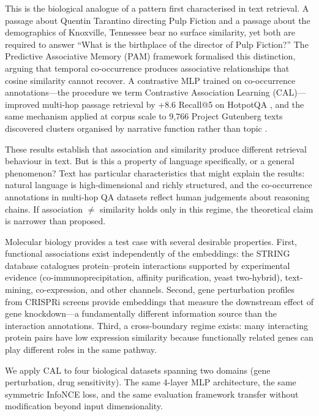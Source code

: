 \documentclass[11pt]{article}
\begin{document}
This is the biological analogue of a pattern first characterised in text retrieval. A passage about Quentin Tarantino directing Pulp Fiction and a passage about the demographics of Knoxville, Tennessee bear no surface similarity, yet both are required to answer ``What is the birthplace of the director of Pulp Fiction?'' The Predictive Associative Memory (PAM) framework \citep{dury2026pam} formalised this distinction, arguing that temporal co-occurrence produces associative relationships that cosine similarity cannot recover. A contrastive MLP trained on co-occurrence annotations---the procedure we term Contrastive Association Learning (CAL)---improved multi-hop passage retrieval by +8.6 Recall@5 on HotpotQA \citep{dury2026aar}, and the same mechanism applied at corpus scale to 9,766 Project Gutenberg texts discovered clusters organised by narrative function rather than topic \citep{dury2026concepts}.

These results establish that association and similarity produce different retrieval behaviour in text. But is this a property of language specifically, or a general phenomenon? Text has particular characteristics that might explain the results: natural language is high-dimensional and richly structured, and the co-occurrence annotations in multi-hop QA datasets reflect human judgements about reasoning chains. If association $\neq$ similarity holds only in this regime, the theoretical claim is narrower than proposed.

Molecular biology provides a test case with several desirable properties. First, functional associations exist independently of the embeddings: the STRING database \citep{szklarczyk2023string} catalogues protein--protein interactions supported by experimental evidence (co-immunoprecipitation, affinity purification, yeast two-hybrid), text-mining, co-expression, and other channels. Second, gene perturbation profiles from CRISPRi screens \citep{replogle2022mapping} provide embeddings that measure the downstream effect of gene knockdown---a fundamentally different information source than the interaction annotations. Third, a cross-boundary regime exists: many interacting protein pairs have low expression similarity because functionally related genes can play different roles in the same pathway.

We apply CAL to four biological datasets spanning two domains (gene perturbation, drug sensitivity). The same 4-layer MLP architecture, the same symmetric InfoNCE loss, and the same evaluation framework transfer without modification beyond input dimensionality.
\end{document}
